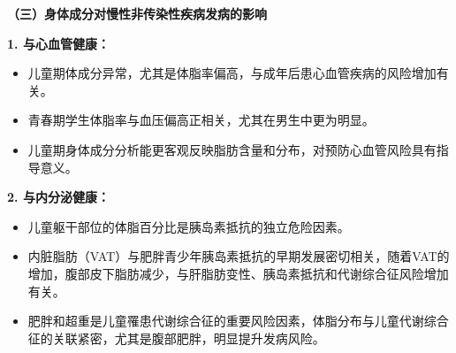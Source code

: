 \begin{keybox}
\textbf{（三）身体成分对慢性非传染性疾病发病的影响}

\textbf{1. 与心血管健康：}
\begin{itemize}[leftmargin=*]
    \item 儿童期体成分异常，尤其是体脂率偏高，与成年后患心血管疾病的风险增加有关。
    \item 青春期学生体脂率与血压偏高正相关，尤其在男生中更为明显。
    \item 儿童期身体成分分析能更客观反映脂肪含量和分布，对预防心血管风险具有指导意义。
\end{itemize}

\textbf{2. 与内分泌健康：}
\begin{itemize}[leftmargin=*]
    \item 儿童躯干部位的体脂百分比是胰岛素抵抗的独立危险因素。
    \item 内脏脂肪（VAT）与肥胖青少年胰岛素抵抗的早期发展密切相关，随着VAT的增加，腹部皮下脂肪减少，与肝脂肪变性、胰岛素抵抗和代谢综合征风险增加有关。
    \item 肥胖和超重是儿童罹患代谢综合征的重要风险因素，体脂分布与儿童代谢综合征的关联紧密，尤其是腹部肥胖，明显提升发病风险。
\end{itemize}
\end{keybox}

\newpage
